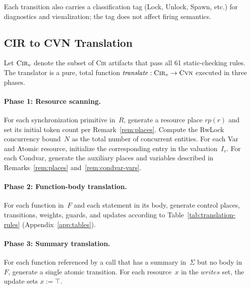 Each transition also carries a classification tag (Lock, Unlock, Spawn, etc.) for diagnostics and visualization; the tag does not affect firing semantics.


\subsection{CIR to CVN Translation}
\label{subsec:translation}


Let $\textsc{Cir}_v$ denote the subset of \textsc{Cir} artifacts that pass all 61 static-checking rules. The translator is a pure, total function $\mathit{translate}:\textsc{Cir}_v\to\textsc{Cvn}$
executed in three phases.

\paragraph{Phase 1: Resource scanning.}
For each synchronization primitive in~$R$, generate a resource place $\mathit{rp}(r)$ and set its initial token count per Remark~\ref{rem:places}. Compute the RwLock concurrency bound~$N$ as the total number of concurrent entities. For each \textsf{Var} and \textsf{Atomic} resource, initialize the corresponding entry in the valuation~$I_v$. For each \textsf{Condvar}, generate the auxiliary places and variables described in Remarks~\ref{rem:places} and~\ref{rem:condvar-vars}.

\paragraph{Phase 2: Function-body translation.}
For each function in~$F$ and each statement in its body, generate control places, transitions, weights, guards, and updates
according to Table~\ref{tab:translation-rules} (Appendix~\ref{app:tables}).

\paragraph{Phase 3: Summary translation.}
For each function referenced by a \textsf{call} that has a summary in~$\Sigma$ but no body in~$F$, generate a single atomic
transition. For each resource~$x$ in the $\mathit{writes}$ set, the update sets $x:=\top$.


